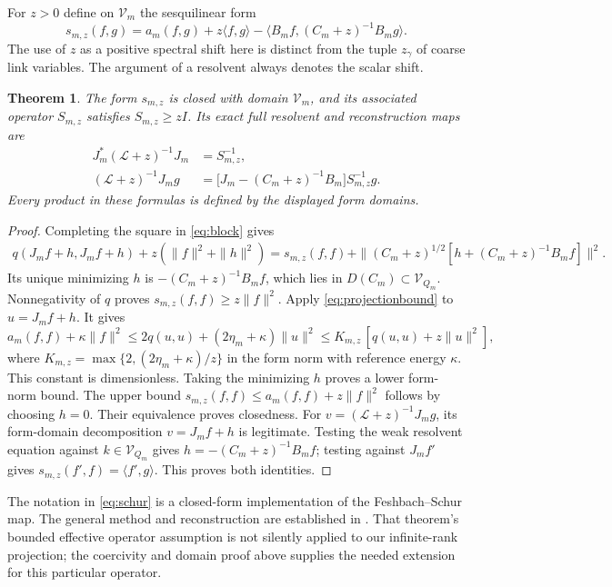 \documentclass[11pt]{article}
\newtheorem{theorem}{Theorem}[section]
\newcommand{\LL}{\mathscr L}
\newcommand{\VV}{\mathscr V}
\begin{document}
For $z>0$ define on $\VV_m$ the sesquilinear form
\begin{equation}\label{eq:schur}
 s_{m,z}(f,g)=a_m(f,g)+z\langle f,g\rangle
             -\langle B_mf,(C_m+z)^{-1}B_mg\rangle.
\end{equation}
The use of $z$ as a positive spectral shift here is distinct from the
tuple $z_\gamma$ of coarse link variables. The argument of a resolvent
always denotes the scalar shift.

\begin{theorem}\label{thm:schur}
The form $s_{m,z}$ is closed with domain $\VV_m$, and its associated
operator $S_{m,z}$ satisfies $S_{m,z}\geq zI$. Its exact full resolvent
and reconstruction maps are
\begin{align}
 J_m^*(\LL+z)^{-1}J_m&=S_{m,z}^{-1},\label{eq:resolvent}\\
 (\LL+z)^{-1}J_mg
 &=\bigl[J_m-(C_m+z)^{-1}B_m\bigr]S_{m,z}^{-1}g.\label{eq:reconstruction}
\end{align}
Every product in these formulas is defined by the displayed form domains.
\end{theorem}
\begin{proof}
Completing the square in \eqref{eq:block} gives
\begin{align}\label{eq:square}
 q(J_mf+h,J_mf+h)+z(\|f\|^2+\|h\|^2)
 =s_{m,z}(f,f)+\|(C_m+z)^{1/2}[h+(C_m+z)^{-1}B_mf]\|^2.
\end{align}
Its unique minimizing $h$ is $-(C_m+z)^{-1}B_mf$, which lies in
$D(C_m)\subset\VV_{Q_m}$. Nonnegativity of $q$ proves
$s_{m,z}(f,f)\geq z\|f\|^2$. Apply \eqref{eq:projectionbound} to
$u=J_mf+h$. It gives
\[
 a_m(f,f)+\kappa\|f\|^2\leq2q(u,u)+(2\eta_m+\kappa)\|u\|^2
 \leq K_{m,z}\,[q(u,u)+z\|u\|^2],
\]
where $K_{m,z}=\max\{2,(2\eta_m+\kappa)/z\}$ in the form norm with
reference energy $\kappa$. This constant is dimensionless.
Taking the minimizing $h$ proves a lower form-norm bound. The upper
bound $s_{m,z}(f,f)\leq a_m(f,f)+z\|f\|^2$ follows by choosing $h=0$.
Their equivalence proves closedness. For $v=(\LL+z)^{-1}J_mg$, its
form-domain decomposition $v=J_mf+h$ is legitimate. Testing the weak
resolvent equation against $k\in\VV_{Q_m}$ gives
$h=-(C_m+z)^{-1}B_mf$; testing against $J_mf'$ gives
$s_{m,z}(f',f)=\langle f',g\rangle$. This proves both identities.
\end{proof}

The notation in \eqref{eq:schur} is a closed-form implementation of the
Feshbach--Schur map. The general method and reconstruction are established
in \cite[Theorem~1.2, Eqs.~(1.10)--(1.16)]{DSS}. That theorem's bounded
effective operator assumption is not silently applied to our infinite-rank
projection; the coercivity and domain proof above supplies the needed
extension for this particular operator.
\end{document}
